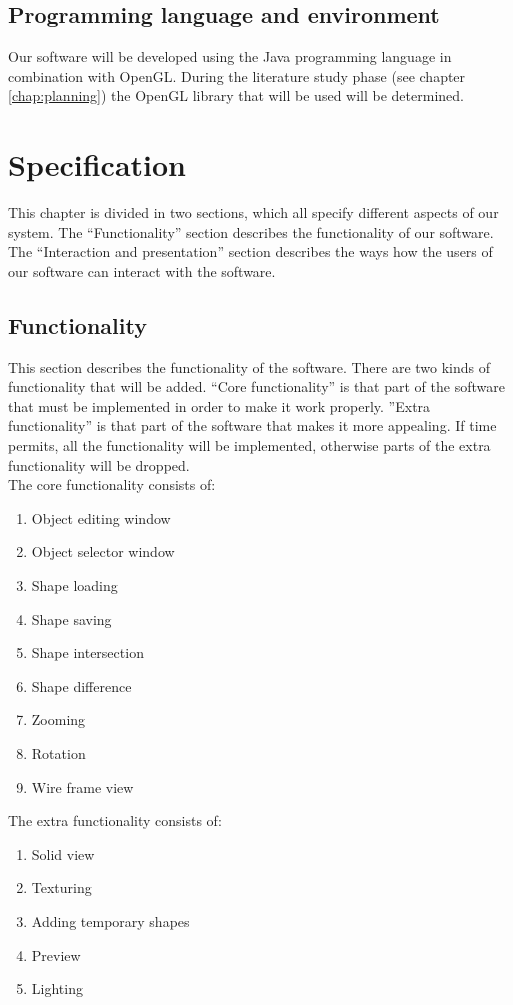 \documentclass[10pt]{report}
\begin{document}
\section{Programming language and environment}
Our software will be developed using the Java programming language in combination with OpenGL. During the literature study phase (see chapter \ref{chap:planning}) the OpenGL library that will be used will be determined.

%
%
\chapter{Specification}
This chapter is divided in two sections, which all specify different aspects of our system. The ``Functionality'' section describes the functionality of our software. The ``Interaction and presentation'' section describes the ways how the users of our software can interact with the software.

\section{Functionality}
\label{sect:functionality}
This section describes the functionality of the software. There are two kinds of functionality that will be added. ``Core functionality'' is that part of the software that must be implemented in order to make it work properly. ''Extra functionality'' is that part of the software that makes it more appealing. If time permits, all the functionality will be implemented, otherwise parts of the extra functionality will be dropped.\\

\noindent The core functionality consists of: \\
\vspace{-10pt}
\begin{enumerate}
	\item Object editing window
	\item Object selector window
	\item Shape loading
	\item Shape saving
	\item Shape intersection
	\item Shape difference
	\item Zooming
	\item Rotation
	\item Wire frame view
\end{enumerate}
\bigskip
\noindent The extra functionality consists of: \\
\vspace{-10pt}
\begin{enumerate}
	\item Solid view
	\item Texturing
	\item Adding temporary shapes
	\item Preview
	\item Lighting
\end{enumerate}
\end{document}

